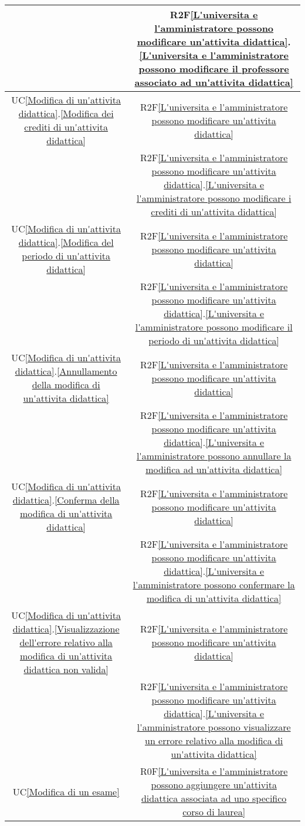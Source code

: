 \begin{longtable}{|c|c|}
& R2F\ref{L'universita e l'amministratore possono modificare un'attivita didattica}.\ref{L'universita e l'amministratore possono modificare il professore associato ad un'attivita didattica}\\
\hline
UC\ref{Modifica di un'attivita didattica}.\ref{Modifica dei crediti di un'attivita didattica} & R2F\ref{L'universita e l'amministratore possono modificare un'attivita didattica}\\
& R2F\ref{L'universita e l'amministratore possono modificare un'attivita didattica}.\ref{L'universita e l'amministratore possono modificare i crediti di un'attivita didattica}\\
\hline
UC\ref{Modifica di un'attivita didattica}.\ref{Modifica del periodo di un'attivita didattica} & R2F\ref{L'universita e l'amministratore possono modificare un'attivita didattica}\\
& R2F\ref{L'universita e l'amministratore possono modificare un'attivita didattica}.\ref{L'universita e l'amministratore possono modificare il periodo di un'attivita didattica}\\
\hline
UC\ref{Modifica di un'attivita didattica}.\ref{Annullamento della modifica di un'attivita didattica} & R2F\ref{L'universita e l'amministratore possono modificare un'attivita didattica}\\
& R2F\ref{L'universita e l'amministratore possono modificare un'attivita didattica}.\ref{L'universita e l'amministratore possono annullare la modifica ad un'attivita didattica}\\
\hline
UC\ref{Modifica di un'attivita didattica}.\ref{Conferma della modifica di un'attivita didattica} & R2F\ref{L'universita e l'amministratore possono modificare un'attivita didattica}\\
& R2F\ref{L'universita e l'amministratore possono modificare un'attivita didattica}.\ref{L'universita e l'amministratore possono confermare la modifica di un'attivita didattica}\\
\hline
UC\ref{Modifica di un'attivita didattica}.\ref{Visualizzazione dell'errore relativo alla modifica di un'attivita didattica non valida} & R2F\ref{L'universita e l'amministratore possono modificare un'attivita didattica}\\
& R2F\ref{L'universita e l'amministratore possono modificare un'attivita didattica}.\ref{L'universita e l'amministratore possono visualizzare un errore relativo alla modifica di un'attivita didattica}\\
\hline
UC\ref{Modifica di un esame} & R0F\ref{L'universita e l'amministratore possono aggiungere un'attivita didattica associata ad uno specifico corso di laurea}\\

\end{longtable}
